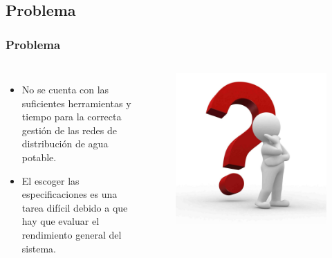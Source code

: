 \documentclass[9pt]{beamer}
\begin{document}
    \subsection{Problema}
    \begin{frame}
        \frametitle{Problema}
        
        \begin{columns}
            \begin{itemize}
                \justifying
                \item No se cuenta con las suficientes herramientas y tiempo para la correcta gestión de las redes de distribución de agua potable.
                \item El escoger las especificaciones es una tarea difícil debido a que hay que evaluar el rendimiento general del sistema.
            \end{itemize}

            \begin{figure}
                \includegraphics[width=\textwidth]{assets/MunecosBlancos/Aproblemado.jpg}
            \end{figure}
        \end{columns}
    \end{frame}
\end{document}
